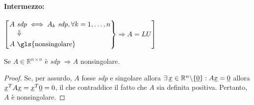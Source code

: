 
\paragraph{Intermezzo:}{$\left[\begin{rcases}
    \Vrightarrow{A\text{ \textit{sdp}}}{}\iff A_k\text{ \textit{sdp}}, \forall k=1,\hdots,n\\
    A\text{ \gls{nonsingolare}}
\end{rcases}\Rightarrow A=LU\right]$}

\begin{theorem}\label{th:matrice_SDP_nonsingolare}
    Se $A\in\mathbb{R}^{n\times n}$ è \textit{sdp} $\Rightarrow A$ \gls{nonsingolare}.
\end{theorem}
\begin{proof}
    Se, per assurdo, $A$ fosse \textit{sdp} e \gls{singolare} allora $\exists\, \uline x\in\mathbb R^n\backslash\{\uline 0\}: A\uline x = \uline 0$ allora  $\uline x^T A \uline x = \uline x^T\uline 0 = 0$, il che contraddice il fatto che $A$ sia definita positiva. Pertanto, $A$ è nonsingolare.
\end{proof}

